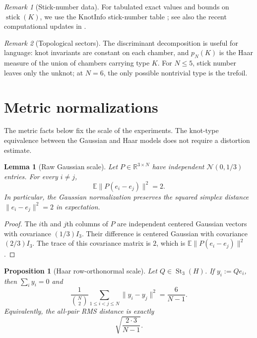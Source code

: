 \documentclass[11pt]{amsart}
\newtheorem{proposition}{Proposition}
\newtheorem{lemma}{Lemma}
\theoremstyle{remark}
\newtheorem{remark}{Remark}
\newcommand{\Ebb}{\mathbb{E}}
\newcommand{\Rbb}{\mathbb{R}}
\newcommand{\1}{\mathbf{1}}
\newcommand{\St}{\operatorname{St}}
\begin{document}
\begin{remark}[Stick-number data]
For tabulated exact values and bounds on \(\operatorname{stick}(K)\), we use
the KnotInfo stick-number table \cite{KnotInfoStick}; see also the recent
computational updates in
\cite{EddyShonkwiler,CantarellaRechnitzerSchumacherShonkwiler}.
\end{remark}

\begin{remark}[Topological sectors]
The discriminant decomposition is useful for language: knot invariants are constant on each
chamber, and \(p_N(K)\) is the Haar measure of the union of chambers carrying type \(K\).
For \(N\le 5\), stick number leaves only the unknot; at \(N=6\), the only possible
nontrivial type is the trefoil.
\end{remark}

\section{Metric normalizations}

The metric facts below fix the scale of the experiments.  The knot-type equivalence between
the Gaussian and Haar models does not require a distortion estimate.

\begin{lemma}[Raw Gaussian scale]\label{lem:raw-distance-law}
Let \(P\in\Rbb^{3\times N}\) have independent \(\mathcal N(0,1/3)\) entries.  For
every \(i\ne j\),
\[
\Ebb\|P(e_i-e_j)\|^2=2 .
\]
In particular, the Gaussian normalization preserves the squared simplex distance
\(\|e_i-e_j\|^2=2\) in expectation.
\end{lemma}

\begin{proof}
The \(i\)th and \(j\)th columns of \(P\) are independent centered Gaussian vectors with
covariance \((1/3)I_3\).  Their difference is centered Gaussian with covariance
\((2/3)I_3\).  The trace of this covariance matrix is \(2\), which is
\(\Ebb\|P(e_i-e_j)\|^2\).
\end{proof}

\begin{proposition}[Haar row-orthonormal scale]\label{prop:haar-scale}
Let \(Q\in\St_3(H)\).  If \(y_i:=Qe_i\), then \(\sum_i y_i=0\) and
\[
\frac{1}{\binom N2}\sum_{1\le i<j\le N}\|y_i-y_j\|^2
=\frac{6}{N-1}.
\]
Equivalently, the all-pair RMS distance is exactly
\[
\sqrt{\frac{2\cdot3}{N-1}}.
\]
\end{proposition}
\end{document}
